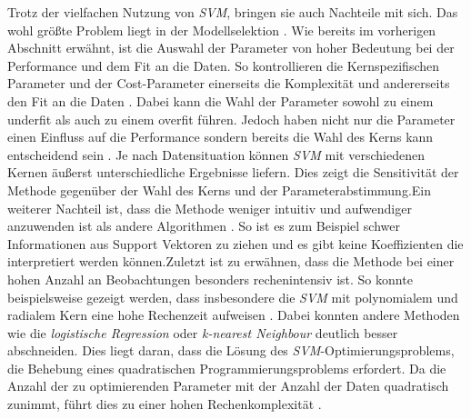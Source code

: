 \documentclass[
]{article}
\begin{document}
Trotz der vielfachen Nutzung von \textit{SVM}, bringen sie auch
Nachteile mit sich. Das wohl größte Problem liegt in der Modellselektion
\parencite{bennettSupportVectorMachines2000}. Wie bereits im vorherigen
Abschnitt erwähnt, ist die Auswahl der Parameter von hoher Bedeutung bei
der Performance und dem Fit an die Daten. So kontrollieren die
Kernspezifischen Parameter und der Cost-Parameter einerseits die
Komplexität und andererseits den Fit an die Daten
\parencite{kuhnAppliedPredictiveModeling2013}. Dabei kann die Wahl der
Parameter sowohl zu einem underfit als auch zu einem overfit führen.
Jedoch haben nicht nur die Parameter einen Einfluss auf die Performance
sondern bereits die Wahl des Kerns kann entscheidend sein
\parencite{burgesTutorialSupportVector1998}. Je nach Datensituation
können \textit{SVM} mit verschiedenen Kernen äußerst unterschiedliche
Ergebnisse liefern. Dies zeigt die Sensitivität der Methode gegenüber
der Wahl des Kerns und der Parameterabstimmung.\newline Ein weiterer
Nachteil ist, dass die Methode weniger intuitiv und aufwendiger
anzuwenden ist als andere Algorithmen
\parencite{bennettSupportVectorMachines2000}. So ist es zum Beispiel
schwer Informationen aus Support Vektoren zu ziehen und es gibt keine
Koeffizienten die interpretiert werden können.\newline Zuletzt ist zu
erwähnen, dass die Methode bei einer hohen Anzahl an Beobachtungen
besonders rechenintensiv ist. So konnte beispielsweise gezeigt werden,
dass insbesondere die \textit{SVM} mit polynomialem und radialem Kern
eine hohe Rechenzeit aufweisen
\parencite{scholzComparisonClassificationMethods2021}. Dabei konnten
andere Methoden wie die \textit{logistische Regression} oder
\textit{k-nearest Neighbour} deutlich besser abschneiden. Dies liegt
daran, dass die Lösung des \textit{SVM}-Optimierungsproblems, die
Behebung eines quadratischen Programmierungsproblems erfordert. Da die
Anzahl der zu optimierenden Parameter mit der Anzahl der Daten
quadratisch zunimmt, führt dies zu einer hohen Rechenkomplexität
\parencite{kecmanSupportVectorMachines2005}.

\printbibliography
\end{document}
